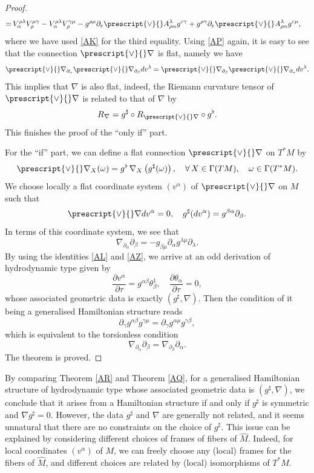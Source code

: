 \documentclass[11pt,a4paper]{amsart}
\numberwithin{equation}{section}
\newcommand{\diff}[2]{\frac{\partial #1}{\partial #2}}
\newcommand{\qa}{\alpha}
\newcommand{\qb}{\beta}
\newcommand{\qg}{\gamma}
\newcommand{\qt}{\tau}
\newcommand{\qth}{\theta}
\newcommand{\qe}{\varepsilon}
\newcommand{\qp}{\partial}
\newcommand{\qo}{\omega}
\newcommand{\Qg}{\Gamma}
\newcommand{\ql}{\lambda}
\newcommand{\kk}[1]{\left(#1\right)}
\numberwithin{equation}{section}
\begin{document}
\begin{proof}
\begin{align*}
=&\,V^{\rho\ql}_\qa V^{\mu\qg}_\rho-V^{\rho\ql}_\qa V^{\qg\mu}_\rho-g^{\rho\mu}\qp_\qe \prescript{\vee}{}A^\ql_{\rho\qa}g^{\qe\qg} + g^{\rho\qg}\qp_\qe \prescript{\vee}{}A^\ql_{\rho\qa} g^{\qe\mu},
\end{align*}
where we have used \eqref{AK} for the third equality. Using \eqref{AP} again, it is easy to see that the connection $\prescript{\vee}{}\nabla$ is flat, namely we have 
\[
\prescript{\vee}{}\nabla_{\qp_\qa}\prescript{\vee}{}\nabla_{\qp_\qb} dv^\ql = \prescript{\vee}{}\nabla_{\qp_\qb}\prescript{\vee}{}\nabla_{\qp_\qa} dv^\ql.
\] 
This implies that $\nabla$ is also flat, indeed, the Riemann curvature tensor of $\prescript{\vee}{}\nabla$ is related to that of $\nabla$ by
\[
R_{\nabla} = g^\sharp\circ R_{\prescript{\vee}{}\nabla}\circ g^\flat.
\]
This finishes the proof of the ``only if'' part.

For the ``if'' part, we can define a flat connection $\prescript{\vee}{}\nabla$ on $T^*M$ by
\[
\prescript{\vee}{}\nabla_X(\qo) = g^\flat\,\nabla_X\kk{g^\sharp(\qo)},\quad \forall\,X\in\Qg(TM),\quad \qo\in\Qg(T^*M).
\]
We choose locally a flat coordinate system $(v^\qa)$ of $\prescript{\vee}{}\nabla$ on $M$ such that 
    \[
    \prescript{\vee}{}\nabla dv^\qa = 0,\quad g^\sharp(dv^\qa) = g^{\qb\qa}\qp_\qb.
    \]
    In terms of this coordinate system, we see that 
    \[
\nabla_{\qp_\qa}\qp_\qb = -g_{\qb\mu}\qp_\qa g^{\ql\mu}\qp_\ql.
    \]
    By using the identities \eqref{AL} and \eqref{AZ}, we arrive at an odd derivation of hydrodynamic type given by 
    \[
    \diff{v^\qa}{\qt} = g^{\qa\qb}\qth_\qb^1,\quad \diff{\qth_\qa}{\qt} = 0,
    \]
    whose associated geometric data is exactly $(g^\sharp,\nabla)$. Then the condition of it being a generalised Hamiltonian structure reads 
    \[
    \qp_\qg g^{\qa\qb}g^{\qg\mu} = \qp_\qg g^{\qa\mu}g^{\qg\qb},
    \]
    which is equivalent to the torsionless condition 
    \[
   \nabla_{\qp_\qa}\qp_\qb = \nabla_{\qp_\qb}\qp_\qa.
    \]
    The theorem is proved.
\end{proof}

By comparing Theorem \ref{AR} and Theorem \ref{AQ}, for a generalised Hamiltonian structure of hydrodynamic type whose associated geometric data is $(g^\sharp,\nabla)$, we conclude that it arises from a Hamiltonian structure if and only if $g^\sharp$ is symmetric and $\nabla g^\sharp = 0$. However, the data $g^\sharp$ and $\nabla$ are generally not related, and it seems unnatural that there are no constraints on the choice of $g^\sharp$. This issue can be explained by considering different choices of frames of fibers of $\hat M$. Indeed, for local coordinates $(v^\qa)$ of $M$, we can freely choose any (local) frames for the fibers of $\hat M$, and different choices are related by (local) isomorphisms of $T^*M$. 
\end{document}
